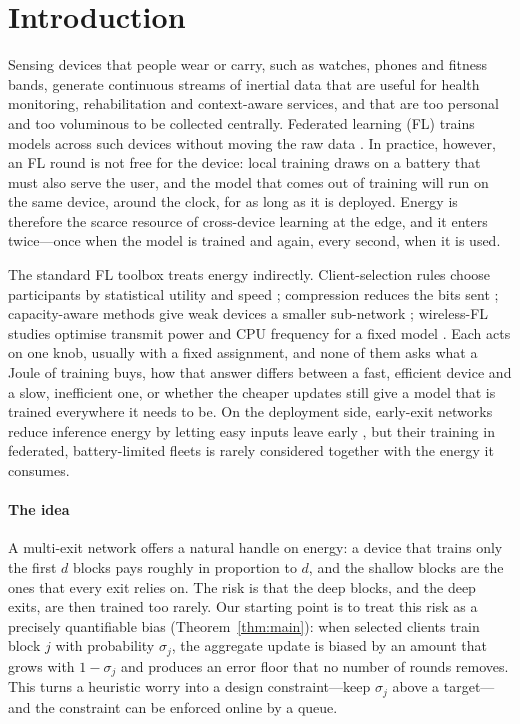 \section{Introduction}\label{sec:intro}

Sensing devices that people wear or carry, such as watches, phones and fitness bands, generate continuous streams of inertial data that are useful for health monitoring, rehabilitation and context-aware services, and that are too personal and too voluminous to be collected centrally. Federated learning (FL) trains models across such devices without moving the raw data \citep{mcmahan2017communication,kairouz2021advances}. In practice, however, an FL round is not free for the device: local training draws on a battery that must also serve the user, and the model that comes out of training will run on the same device, around the clock, for as long as it is deployed. Energy is therefore the scarce resource of cross-device learning at the edge, and it enters twice---once when the model is trained and again, every second, when it is used.

The standard FL toolbox treats energy indirectly. Client-selection rules choose participants by statistical utility and speed \citep{lai2021oort}; compression reduces the bits sent \citep{konecny2016federated,alistarh2017qsgd}; capacity-aware methods give weak devices a smaller sub-network \citep{diao2021heterofl,kim2023depthfl,ilhan2023scalefl}; wireless-FL studies optimise transmit power and CPU frequency for a fixed model \citep{tran2019federated,yang2021energy}. Each acts on one knob, usually with a fixed assignment, and none of them asks what a Joule of training buys, how that answer differs between a fast, efficient device and a slow, inefficient one, or whether the cheaper updates still give a model that is trained everywhere it needs to be. On the deployment side, early-exit networks reduce inference energy by letting easy inputs leave early \citep{teerapittayanon2016branchynet,kaya2019shallow}, but their training in federated, battery-limited fleets is rarely considered together with the energy it consumes.

\paragraph{The idea}
A multi-exit network offers a natural handle on energy: a device that trains only the first $d$ blocks pays roughly in proportion to $d$, and the shallow blocks are the ones that every exit relies on. The risk is that the deep blocks, and the deep exits, are then trained too rarely. Our starting point is to treat this risk as a precisely quantifiable bias (Theorem~\ref{thm:main}): when selected clients train block $j$ with probability $\sigma_j$, the aggregate update is biased by an amount that grows with $1-\sigma_j$ and produces an error floor that no number of rounds removes. This turns a heuristic worry into a design constraint---keep $\sigma_j$ above a target---and the constraint can be enforced online by a queue.

